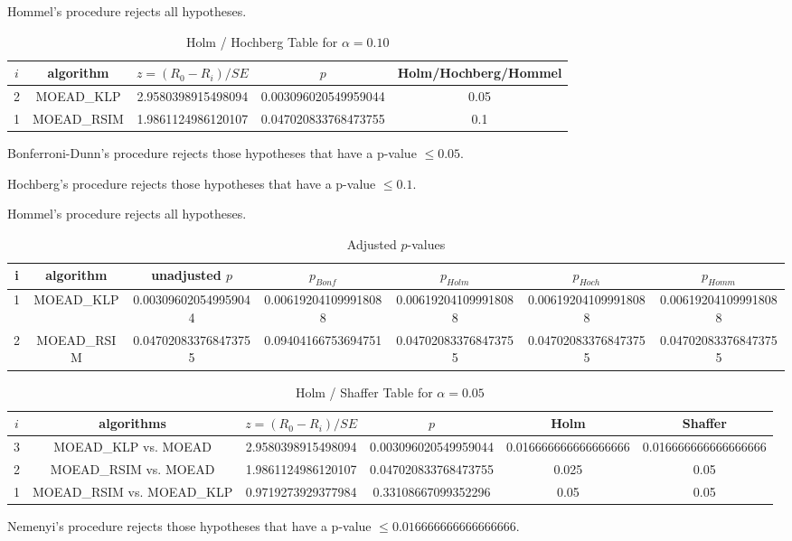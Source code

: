 \documentclass[a4paper,10pt]{article}
\begin{document}
\begin{landscape}
Hommel's procedure rejects all hypotheses.


\begin{table}[!htp]
\centering\tiny
\caption{Holm / Hochberg Table for $\alpha=0.10$}
\begin{tabular}{ccccc}
$i$&algorithm&$z=(R_0 - R_i)/SE$&$p$&Holm/Hochberg/Hommel\\
\hline
2&MOEAD_KLP&2.9580398915498094&0.003096020549959044&0.05\\
1&MOEAD_RSIM&1.9861124986120107&0.047020833768473755&0.1\\
\hline
\end{tabular}
\end{table}
Bonferroni-Dunn's procedure rejects those hypotheses that have a p-value $\le0.05$.


Hochberg's procedure rejects those hypotheses that have a p-value $\le0.1$.


Hommel's procedure rejects all hypotheses.


\begin{table}[!htp]
\centering\tiny
\caption{Adjusted $p$-values}
\begin{tabular}{ccccccc}
i&algorithm&unadjusted $p$&$p_{Bonf}$&$p_{Holm}$&$p_{Hoch}$&$p_{Homm}$\\
\hline
1&MOEAD_KLP&0.003096020549959044&0.006192041099918088&0.006192041099918088&0.006192041099918088&0.006192041099918088\\
2&MOEAD_RSIM&0.047020833768473755&0.09404166753694751&0.047020833768473755&0.047020833768473755&0.047020833768473755\\
\hline
\end{tabular}
\end{table}

\begin{table}[!htp]
\centering\tiny
\caption{Holm / Shaffer Table for $\alpha=0.05$}
\begin{tabular}{cccccc}
$i$&algorithms&$z=(R_0 - R_i)/SE$&$p$&Holm&Shaffer\\
\hline
3&MOEAD_KLP vs. MOEAD&2.9580398915498094&0.003096020549959044&0.016666666666666666&0.016666666666666666\\
2&MOEAD_RSIM vs. MOEAD&1.9861124986120107&0.047020833768473755&0.025&0.05\\
1&MOEAD_RSIM vs. MOEAD_KLP&0.9719273929377984&0.33108667099352296&0.05&0.05\\
\hline
\end{tabular}
\end{table}
Nemenyi's procedure rejects those hypotheses that have a p-value $\le0.016666666666666666$.



\end{landscape}
\end{document}
